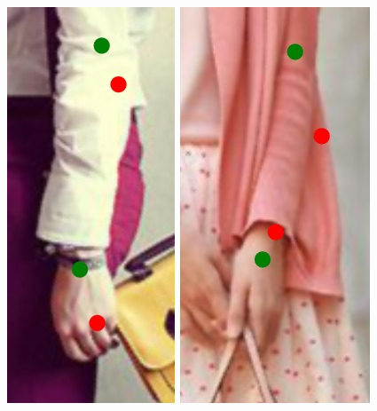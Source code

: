 \begin{figure}[!t]
    \includegraphics[height=\fh]{resources/Annotation_Correction/Fixing/fix_10}
    \hfill
    \includegraphics[height=\fh]{resources/Annotation_Correction/Fixing/fix_20}
    \hfill

\end{figure}
